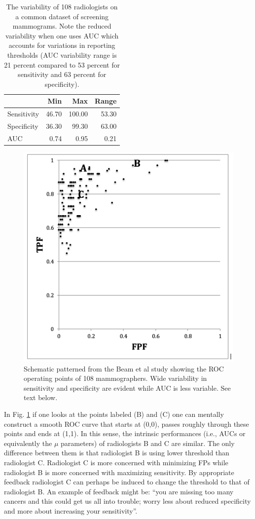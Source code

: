 \documentclass[
]{book}
\begin{document}
\begin{table}

\caption{\label{tab:binary-task-model-table-beam-study}The variability of 108 radiologists on a common dataset of screening mammograms. Note the reduced variability when one uses AUC which accounts for variations in reporting thresholds (AUC variability range is 21 percent compared to 53 percent for sensitivity and 63 percent for specificity).}
\centering
\begin{tabular}[t]{l|r|r|r}
\hline
  & Min & Max & Range\\
\hline
Sensitivity & 46.70 & 100.00 & 53.30\\
\hline
Specificity & 36.30 & 99.30 & 63.00\\
\hline
AUC & 0.74 & 0.95 & 0.21\\
\hline
\end{tabular}
\end{table}

\begin{figure}
\includegraphics[width=0.8\linewidth]{images/BeamStudy} \caption{Schematic patterned from the Beam et al study showing the ROC operating points of 108 mammographers. Wide variability in sensitivity and specificity are evident while AUC is less variable. See text below.}\label{fig:beam-study-fig}
\end{figure}

In Fig. \ref{fig:beam-study-fig} if one looks at the points labeled (B) and (C) one can mentally construct a smooth ROC curve that starts at (0,0), passes roughly through these points and ends at (1,1). In this sense, the intrinsic performances (i.e., AUCs or equivalently the \(\mu\) parameters) of radiologists B and C are similar. The only difference between them is that radiologist B is using lower threshold than radiologist C. Radiologist C is more concerned with minimizing FPs while radiologist B is more concerned with maximizing sensitivity. By appropriate feedback radiologist C can perhaps be induced to change the threshold to that of radiologist B. An example of feedback might be: ``you are missing too many cancers and this could get us all into trouble; worry less about reduced specificity and more about increasing your sensitivity''.
\end{document}

